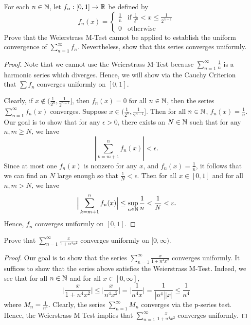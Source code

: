 \documentclass[a4paper]{article}
\begin{document}
\begin{problem}
    For each \( n \in \mathbb{N} \), let \( {f}_{n}: [0,1] \to \mathbb{R}  \) be defined by
    \[  {f}_{n}(x) = 
    \begin{cases}
        \frac{ 1 }{ n }  &\text{if} \ \frac{ 1 }{ 2^{n} }  < x \leq \frac{ 1 }{ 2^{n-1} } \\
        0 &\text{otherwise}
    \end{cases} \]
    Prove that the Weierstrass M-Test cannot be applied to establish the uniform convergence of \( \sum_{ n=1  }^{ \infty  } {f}_{n} \). Nevertheless, show that this series converges uniformly.
\end{problem}
\begin{proof}
    Note that we cannot use the Weierstrass M-Test because \( \sum_{ n=1  }^{ \infty  } \frac{ 1 }{ n }  \) is a harmonic series which diverges. Hence, we will show via the Cauchy Criterion that \( \sum  {f}_{n}  \) converges uniformly on \( [0,1] \).

    Clearly, if \( x \notin (\frac{ 1 }{ 2^{n} } , \frac{ 1 }{ 2^{n-1} } ] \), then \( {f}_{n}(x) = 0  \) for all \( n \in \mathbb{N} \), then the series \( \sum_{ n=1  }^{ \infty  } {f}_{n}(x) \) converges. Suppose \( x \in (\frac{ 1 }{ 2^{n} } , \frac{ 1 }{ 2^{n-1} } ] \). Then for all \( n \in \mathbb{N} \), \( {f}_{n}(x) = \frac{ 1 }{ n }  \). Our goal is to show that for any \( \epsilon > 0  \), there exists an \( N \in \mathbb{N} \) such that for any \( n,m \geq N  \), we have 
    \[  | \sum_{ k =  m  + 1  }^{ n } {f}_{n}(x) |  < \epsilon. \]
    Since at most one \( {f}_{n}(x) \) is nonzero for any \( x  \), and \( {f}_{n}(x) = \frac{ 1 }{ n }  \), it follows that we can find an \( N  \) large enough so that \( \frac{ 1 }{ N  } < \epsilon. \) Then for all \( x \in [0,1] \) and for all \( n,m > N  \), we have 
    \[  \Big| \sum_{ k=m+1 }^{ n } {f}_{n}(x) \Big| \leq \sup_{n \in \mathbb{N}} \frac{ 1 }{ n } < \frac{ 1 }{ N } < \varepsilon.  \]
    Hence, \( {f}_{n}  \) converges uniformly on \( [0,1] \).
\end{proof}

\begin{problem}
    Prove that \( \sum_{ n=1  }^{ \infty  } \frac{ x  }{  1  +n^{4} x^{2} }   \) converges uniformly on \( [0,\infty) \).
\end{problem}
\begin{proof}
    Our goal is to show that the series \( \sum_{ n=1  }^{ \infty  } \frac{ x  }{  1 + n^{4} x^{2} }  \) converges uniformly. It suffices to show that the series above satisfies the Weierstrass M-Test. Indeed, we see that for all \( n \in \mathbb{N} \) and for all \( x \in [0,\infty ] \), 
\[ \Big| \frac{ x  }{  1 + n^{4} x^{2}  }   \Big|  \leq \Big| \frac{ x  }{ n^{4} x^{2} }  \Big| = \Big| \frac{ 1 }{ n^{4} x  }  \Big| = \frac{ 1 }{ | n^{4} | | x  |  } \leq \frac{ 1 }{ n^{4} }    \]
where \( {M}_{n} = \frac{ 1 }{ n^{4} }  \). Clearly, the series \( \sum_{ n=1  }^{ \infty  } {M}_{n} \) converges via the p-series test. Hence, the Weierstrass M-Test implies that \( \sum_{ n=1  }^{ \infty  } \frac{ x  }{  1 + n^{4} x^{2} }  \) converges uniformly.
\end{proof}
\end{document}
